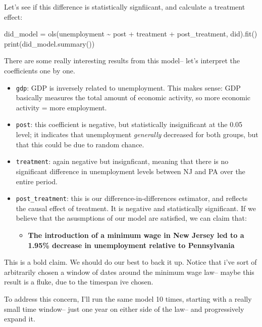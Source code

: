 \documentclass[
  letterpaper,
  DIV=11,
  numbers=noendperiod]{scrreprt}
\newenvironment{Shaded}{\begin{snugshade}}{\end{snugshade}}
\newcommand{\BuiltInTok}[1]{\textcolor[rgb]{0.00,0.23,0.31}{#1}}
\newcommand{\NormalTok}[1]{\textcolor[rgb]{0.00,0.23,0.31}{#1}}
\newcommand{\OperatorTok}[1]{\textcolor[rgb]{0.37,0.37,0.37}{#1}}
\newcommand{\StringTok}[1]{\textcolor[rgb]{0.13,0.47,0.30}{#1}}
\providecommand{\tightlist}{%
  \setlength{\itemsep}{0pt}\setlength{\parskip}{0pt}}\usepackage{longtable,booktabs,array}
\begin{document}
Let's see if this difference is statistically signfiicant, and calculate
a treatment effect:

\begin{Shaded}
\begin{Highlighting}[]
\NormalTok{did\_model }\OperatorTok{=}\NormalTok{ ols(}\StringTok{\textquotesingle{}unemployment \textasciitilde{}  post + treatment + post\_treatment\textquotesingle{}}\NormalTok{, did).fit()}
\BuiltInTok{print}\NormalTok{(did\_model.summary())}
\end{Highlighting}
\end{Shaded}

There are some really interesting results from this model-- let's
interpret the coefficients one by one.

\begin{itemize}
\tightlist
\item
  \texttt{gdp}: GDP is inversely related to unemployment. This makes
  sense: GDP basically measures the total amount of economic activity,
  so more economic activity = more employment.
\item
  \texttt{post}: this coefficient is negative, but statistically
  insignificant at the 0.05 level; it indicates that unemployment
  \emph{generally} decreased for both groups, but that this could be due
  to random chance.
\item
  \texttt{treatment}: again negative but insignficant, meaning that
  there is no significant difference in unemployment levels between NJ
  and PA over the entire period.
\item
  \texttt{post\_treatment}: this is our difference-in-differences
  estimator, and reflects the causal effect of treatment. It is negative
  and statistically significant. If we believe that the asusmptions of
  our model are satisfied, we can claim that:

  \begin{itemize}
  \tightlist
  \item
    \textbf{The introduction of a minimum wage in New Jersey led to a
    1.95\% decrease in unemployment relative to Pennsylvania}
  \end{itemize}
\end{itemize}

This is a bold claim. We should do our best to back it up. Notice that
i've sort of arbitrarily chosen a window of dates around the minimum
wage law-- maybe this result is a fluke, due to the timespan ive chosen.

To address this concern, I'll run the same model 10 times, starting with
a really small time window-- just one year on either side of the law--
and progressively expand it.
\end{document}
